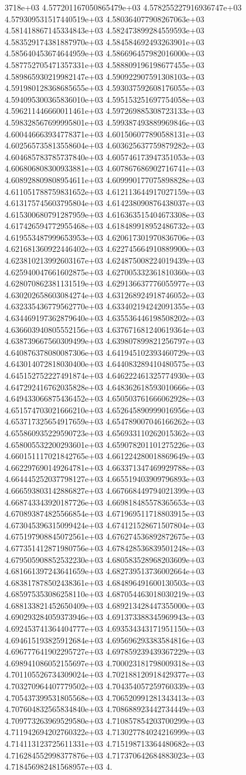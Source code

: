 3718e+03	4.577201167050865479e+03	4.578255227916936747e+03	4.579309531517440519e+03	4.580364077908267063e+03	4.581418867145334843e+03	4.582473899284559593e+03	4.583529174381887970e+03	4.584584692493263901e+03	4.585640453674644959e+03	4.586696457982016000e+03	4.587752705471357331e+03	4.588809196198677455e+03	4.589865930219982147e+03	4.590922907591308103e+03	4.591980128368685655e+03	4.593037592608176055e+03	4.594095300365836010e+03	4.595153251697754058e+03	4.596211446660011461e+03	4.597269885308723133e+03	4.598328567699995801e+03	4.599387493889969846e+03	4.600446663934778371e+03	4.601506077890588131e+03	4.602565735813558604e+03	4.603625637759879282e+03	4.604685783785737840e+03	4.605746173947351053e+03	4.606806808300933881e+03	4.607867686902716741e+03	4.608928809808954611e+03	4.609990177075898828e+03	4.611051788759831652e+03	4.612113644917027159e+03	4.613175745603795804e+03	4.614238090876438037e+03	4.615300680791287959e+03	4.616363515404673308e+03	4.617426594772955468e+03	4.618489918952486732e+03	4.619553487999653953e+03	4.620617301970836706e+03	4.621681360922446402e+03	4.622745664910889900e+03	4.623810213992603167e+03	4.624875008224019439e+03	4.625940047661602875e+03	4.627005332361810360e+03	4.628070862381131519e+03	4.629136637776055977e+03	4.630202658603084274e+03	4.631268924918746052e+03	4.632335436779562770e+03	4.633402194242091355e+03	4.634469197362879640e+03	4.635536446198508202e+03	4.636603940805552156e+03	4.637671681240619364e+03	4.638739667560309499e+03	4.639807899821256797e+03	4.640876378080087306e+03	4.641945102393460729e+03	4.643014072818030400e+03	4.644083289410480575e+03	4.645152752227491874e+03	4.646222461325774930e+03	4.647292416762035828e+03	4.648362618593010666e+03	4.649433066875436452e+03	4.650503761666062928e+03	4.651574703021666210e+03	4.652645890999016956e+03	4.653717325654917659e+03	4.654789007046166262e+03	4.655860935229590723e+03	4.656933110262015362e+03	4.658005532200293601e+03	4.659078201101275226e+03	4.660151117021842765e+03	4.661224280018869649e+03	4.662297690149264781e+03	4.663371347469929788e+03	4.664445252037798127e+03	4.665519403909796893e+03	4.666593803142886827e+03	4.667668449794021399e+03	4.668743343920187726e+03	4.669818485578365653e+03	4.670893874825566854e+03	4.671969511718803915e+03	4.673045396315099424e+03	4.674121528671507804e+03	4.675197908845072561e+03	4.676274536892872675e+03	4.677351412871980756e+03	4.678428536839501248e+03	4.679505908852532230e+03	4.680583528968203609e+03	4.681661397243641659e+03	4.682739513736002664e+03	4.683817878502438361e+03	4.684896491600130503e+03	4.685975353086258110e+03	4.687054463018030219e+03	4.688133821452650409e+03	4.689213428447355000e+03	4.690293284059373946e+03	4.691373388345969943e+03	4.692453741364404777e+03	4.693534343171951150e+03	4.694615193825912684e+03	4.695696293383584816e+03	4.696777641902295727e+03	4.697859239439367229e+03	4.698941086052155697e+03	4.700023181798009318e+03	4.701105526734309024e+03	4.702188120918429377e+03	4.703270964407779502e+03	4.704354057259760339e+03	4.705437399531805568e+03	4.706520991281343413e+03	4.707604832565834840e+03	4.708688923442734449e+03	4.709773263969529580e+03	4.710857854203700299e+03	4.711942694202760322e+03	4.713027784024216999e+03	4.714113123725611331e+03	4.715198713364480682e+03	4.716284552998377876e+03	4.717370642684883023e+03	4.718456982481568957e+03	4.